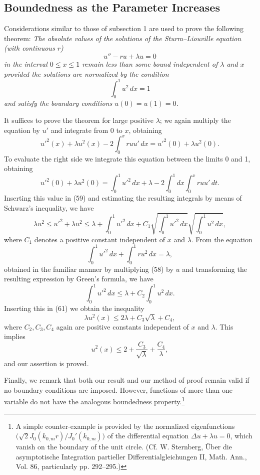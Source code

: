 \subsection{Boundedness as the Parameter Increases}
Considerations similar to those of subsection 1 are used to prove the following theorem: \emph{The absolute values of the solutions of the Sturm--Liouville equation (with continuous $r$)}
\begin{equation}
u''-ru+\lambda u=0
\tag{58}
\end{equation}
\emph{in the interval $0\le x\le1$ remain less than some bound independent of $\lambda$ and $x$ provided the solutions are normalized by the condition}
\[
\int_0^1u^2\,dx=1
\]
\emph{and satisfy the boundary conditions $u(0)=u(1)=0$.}

It suffices to prove the theorem for large positive $\lambda$; we again multiply the equation by $u'$ and integrate from 0 to $x$, obtaining
\begin{equation}
u'^2(x)+\lambda u^2(x)-2\int_0^xruu'\,dx=u'^2(0)+\lambda u^2(0).
\tag{59}
\end{equation}
To evaluate the right side we integrate this equation between the limits 0 and 1, obtaining
\begin{equation}
u'^2(0)+\lambda u^2(0)=\int_0^1u'^2\,dx+\lambda-2\int_0^1dx\int_0^xruu'\,dt.
\tag{60}
\end{equation}
Inserting this value in (59) and estimating the resulting integrals by means of Schwarz's inequality, we have
\begin{equation}
\lambda u^2\le u'^2+\lambda u^2\le \lambda+\int_0^1u'^2\,dx+C_1\sqrt{\int_0^1u'^2\,dx}\sqrt{\int_0^1u^2\,dx},
\tag{61}
\end{equation}
where $C_1$ denotes a positive constant independent of $x$ and $\lambda$. From the equation
\[
\int_0^1u'^2\,dx+\int_0^1ru^2\,dx=\lambda,
\]
obtained in the familiar manner by multiplying (58) by $u$ and transforming the resulting expression by Green's formula, we have
\[
\int_0^1u'^2\,dx\le\lambda+C_2\int_0^1u^2\,dx.
\]
Inserting this in (61) we obtain the inequality
\[
\lambda u^2(x)\le2\lambda+C_3\sqrt{\lambda}+C_4,
\]
where $C_2,C_3,C_4$ again are positive constants independent of $x$ and $\lambda$. This implies
\[
u^2(x)\le2+\frac{C_3}{\sqrt\lambda}+\frac{C_4}{\lambda},
\]
and our assertion is proved.

Finally, we remark that both our result and our method of proof remain valid if no boundary conditions are imposed. However, functions of more than one variable do not have the analogous boundedness property.\footnote{A simple counter-example is provided by the normalized eigenfunctions $\bigl(\sqrt2 J_0(k_{0,m}r)/J_0'(k_{0,m})\bigr)$ of the differential equation $\Delta u+\lambda u=0$, which vanish on the boundary of the unit circle. (Cf. W. Sternberg, \"Uber die asymptotische Integration partieller Differentialgleichungen II, Math. Ann., Vol. 86, particularly pp. 292--295.)}

